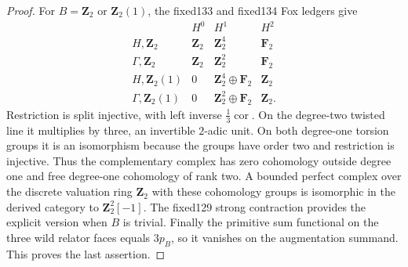 \begin{proof}
For $B=\mathbf Z_2$
or $\mathbf Z_2(1)$,
the fixed133 and
fixed134 Fox
ledgers give
\[
\begin{array}{c|ccc}
&H^0&H^1&H^2\\ \hline
H,\mathbf Z_2&
\mathbf Z_2&\mathbf Z_2^4&\mathbf F_2\\
\Gamma,\mathbf Z_2&
\mathbf Z_2&\mathbf Z_2^2&\mathbf F_2\\
H,\mathbf Z_2(1)&
0&\mathbf Z_2^4\oplus\mathbf F_2&\mathbf Z_2\\
\Gamma,\mathbf Z_2(1)&
0&\mathbf Z_2^2\oplus\mathbf F_2&\mathbf Z_2 .
\end{array}
\]
Restriction is
split injective,
with left inverse
$\tfrac13\operatorname{cor}$.
On the degree-two
twisted line it
multiplies by three,
an invertible
$2$-adic unit.
On both
degree-one
torsion groups
it is an
isomorphism
because the
groups have order
two and restriction
is injective.
Thus the complementary
complex has zero
cohomology outside
degree one and
free degree-one
cohomology of
rank two.
A bounded
perfect complex
over the discrete
valuation ring
$\mathbf Z_2$
with these
cohomology groups
is isomorphic
in the derived
category to
$\mathbf Z_2^2[-1]$.
The fixed129
strong contraction
provides the
explicit version
when $B$ is trivial.
Finally the
primitive
sum functional
on the three
wild relator
faces equals
$3p_B$, so it
vanishes on
the augmentation
summand.
This proves
the last assertion.
\end{proof}

